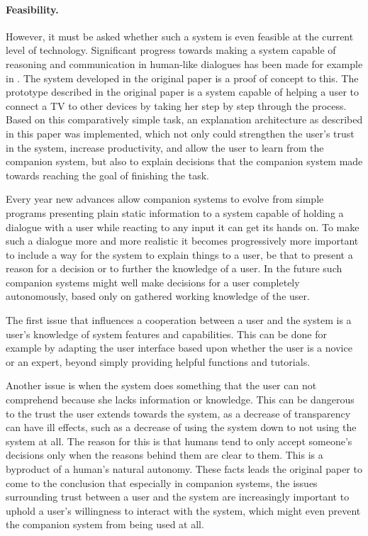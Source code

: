 \documentclass[a4paper]{article}
\begin{document}
\paragraph{Feasibility.} However, it must be asked whether such a system is even feasible at the current level of technology. Significant progress towards making a system capable of reasoning and communication in human-like dialogues has been made for example in \cite{allen2001toward}. The system developed in the original paper is a proof of concept to this. The prototype described in the original paper is a system capable of helping a user to connect a TV to other devices by taking her step by step through the process. Based on this comparatively simple task, an explanation architecture as described in this paper was implemented, which not only could strengthen the user's trust in the system, increase productivity, and allow the user to learn from the companion system, but also to explain decisions that the companion system made towards reaching the goal of finishing the task.

Every year new advances allow companion systems to evolve from simple programs presenting plain static information to a system capable of holding a dialogue with a user while reacting to any input it can get its hands on. To make such a dialogue more and more realistic it becomes progressively more important to include a way for the system to explain things to a user, be that to present a reason for a decision or to further the knowledge of a user. In the future such companion systems might well make decisions for a user completely autonomously, based only on gathered working knowledge of the user.\label{adaptive_companion}

The first issue that influences a cooperation between a user and the system is a user's knowledge of system features and capabilities. This can be done for example by adapting the user interface based upon whether the user is a novice or an expert, beyond simply providing helpful functions and tutorials.

Another issue is when the system does something that the user can not comprehend because she lacks information or knowledge. This can be dangerous to the trust the user extends towards the system, as a decrease of transparency can have ill effects, such as a decrease of using the system down to not using the system at all. The reason for this is that humans tend to only accept someone's decisions only when the reasons behind them are clear to them. This is a byproduct of a human's natural autonomy. These facts leads the original paper to come to the conclusion that especially in companion systems, the issues surrounding trust between a user and the system are increasingly important to uphold a user's willingness to interact with the system, which might even prevent the companion system from being used at all.
\end{document}
